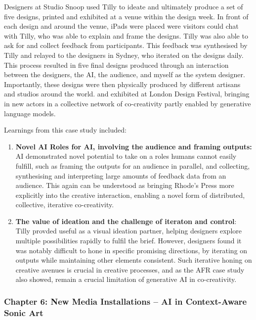 Designers at Studio Snoop used Tilly to ideate and ultimately produce a set of five designs, printed and exhibited at a venue within the design week. In front of each design and around the venue, iPads were placed were visitors could chat with Tilly, who was able to explain and frame the designs. Tilly was also able to ask for and collect feedback from participants. This feedback was synthesised by Tilly and relayed to the designers in Sydney, who iterated on the designs daily. This process resulted in five final designs produced through an interaction between the designers, the AI, the audience, and myself as the system designer. Importantly, these designs were then physically produced by different artisans and studios around the world. and exhibited at London Design Festival, bringing in new actors in a collective network of co-creativity partly enabled by generative language models. 

Learnings from this case study included:

\begin{enumerate}
    \item \textbf{Novel AI Roles for AI, involving the audience and framing outputs:} AI demonstrated novel potential to take on a roles humans cannot easily fulfill, such as framing the outputs for an audience in parallel, and collecting, synthesising and interpreting large amounts of feedback data from an audience. This again can be understood as bringing Rhode's Press more explicitly into the creative interaction, enabling a novel form of distributed, collective, iterative co-creativity.
    \item \textbf{The value of ideation and the challenge of iteraton and control}: Tilly provded useful as a visual ideation partner, helping designers explore multiple possibilities rapidly to fulfil the brief. However, designers found it was notably difficult to hone in specific promising directions, by iterating on outputs while maintaining other elements consistent. Such iterative honing on creative avenues is crucial in creative processes, and as the AFR case study also showed, remain a crucial limitation of generative AI in co-creativity. 
\end{enumerate}

\subsubsection{\textbf{Chapter 6: New Media Installations – AI in Context-Aware Sonic Art}}

